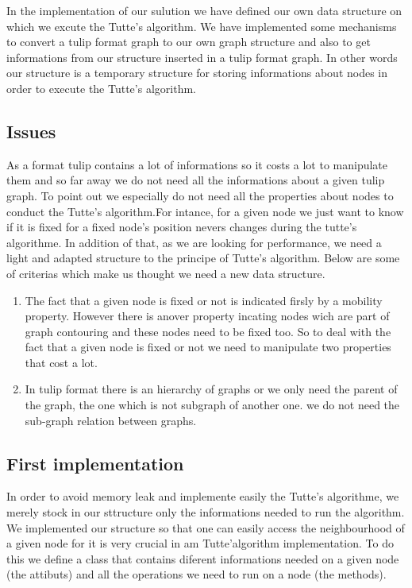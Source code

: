 In the implementation of our sulution we have defined our own data
structure on which we excute the Tutte's algorithm. We have
implemented some mechanisms to convert a tulip format graph to our own
graph structure and also to get informations from our structure
inserted in a tulip format graph. In other words our structure is a
temporary structure for storing informations about nodes in order to
execute the Tutte's algorithm.

\subsection{Issues}
As a format tulip contains a lot of informations so it costs a lot to
manipulate them and so far away we do not need all the informations
about a given tulip graph. To point out we especially do not need all
the properties about nodes to conduct the Tutte's algorithm.For
intance, for a given node we just want to know if it is fixed for a
fixed node's position nevers changes during the tutte's algorithme. In
addition of that, as we are looking for performance, we need a light
and adapted structure to the principe of Tutte's algorithm. Below are
some of criterias which make us thought we need a new data structure.
\begin{enumerate}
\item The fact that a given node is fixed or not is indicated firsly
  by a mobility property. However there is anover property incating
  nodes wich are part of graph contouring and these nodes need to be
  fixed too. So to deal with the fact that a given node is fixed or
  not we need to manipulate two properties that cost a lot.

\item In tulip format there is an hierarchy of graphs or we only need
  the parent of the graph, the one which is not subgraph of another
  one. we do not need the sub-graph relation between graphs.


\end{enumerate}  

\subsection{First implementation}
In order to avoid memory leak and implemente easily the Tutte's
algorithme, we merely stock in our sttructure only the informations
needed to run the algorithm. We implemented our structure so that one
can easily access the neighbourhood of a given node for it is very
crucial in am Tutte'algorithm implementation. To do this we define a
class that contains diferent informations needed on a given node (the
attibuts) and all the operations we need to run on a node (the
methods).

